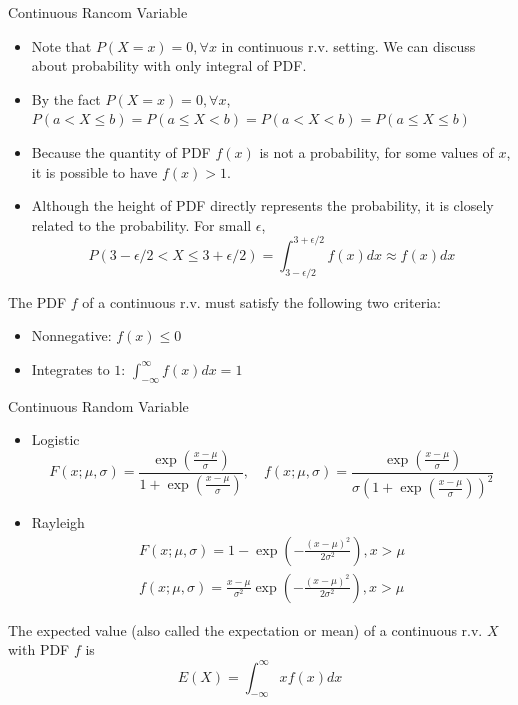 \documentclass[8pt]{beamer}
\newcommand{\myexp}[1]{\exp{\left(#1\right)}}
\begin{document}
\begin{frame}{Continuous Rancom Variable}
    \begin{itemize}
        \item Note that $P(X=x) = 0, \forall x $  in continuous r.v. setting. We can discuss about probability with only integral of PDF.
        \item By the fact $P(X=x)=0, \forall x$, $P(a<X\leq b) = P(a\leq X <b) = P(a< X <b) = P(a \leq X \leq b)$
        \item Because the quantity of PDF $f(x)$ is not a probability, for some values of $x$, it is possible to have $f(x) > 1$.
        \item  Although the height of PDF directly represents the probability, it is closely related to the probability. For small $\epsilon$, 
        \[
            P(3 - \epsilon /2 < X \leq 3 + \epsilon/2 ) = \int_{3- \epsilon/2}^{3 + \epsilon/2} f(x) dx \approx f(x) dx
        \]
    \end{itemize}

    \begin{theorem}
        The PDF $f$ of a continuous r.v. must satisfy the following two criteria:
        \begin{itemize}
            \item Nonnegative: $f(x)\leq 0$
            \item Integrates to $1$: $\int_{-\infty}^\infty f(x) dx = 1$
        \end{itemize}
    \end{theorem}
\end{frame}

\begin{frame}{Continuous Random Variable}
    \begin{example}
        \begin{itemize}
            \item Logistic 
            \[
                F(x; \mu, \sigma) = \frac{\myexp{\frac{x-\mu}{\sigma }}}{1 + \myexp{\frac{x-\mu}{\sigma }}}, \quad f(x; \mu, \sigma) = \frac{\myexp{\frac{x-\mu}{\sigma }}}{\sigma \left(1 + \myexp{\frac{x-\mu}{\sigma }}\right)^2}
            \]
            \item Rayleigh 
            \[
            \begin{gathered}
                F(x; \mu, \sigma) = 1  - \myexp{- \frac{(x-\mu)^2}{2 \sigma^2}}, x > \mu  \\f(x; \mu, \sigma) = \frac{x-\mu}{\sigma^2} \myexp{-\frac{(x-\mu)^2}{2 \sigma^2}}, x > \mu
            \end{gathered}
            \]
        \end{itemize}
    \end{example}

   

    \begin{definition}
        The expected value (also called the expectation or mean) of a continuous r.v. $X$ with PDF $f$ is 
        \[
        E(X) = \int_{-\infty}^\infty x f(x) dx
        \]
    
    \end{definition}
\end{frame}
\end{document}
